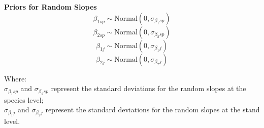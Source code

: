 \documentclass[11pt,letter]{article}
\begin{document}
\textbf{Priors for Random Slopes}
\[
\beta_{1 sp} \sim \text{Normal}(0, \sigma_{\beta_1 sp})
\]
\[
\beta_{2 sp} \sim \text{Normal}(0, \sigma_{\beta_2 sp})
\]
\[
\beta_{1 j} \sim \text{Normal}(0, \sigma_{\beta_1 j})
\]
\[
\beta_{2 j} \sim \text{Normal}(0, \sigma_{\beta_2 j})
\]

Where:\\ %
\(\sigma_{\beta_1 sp}\) and \(\sigma_{\beta_2 sp}\) represent the standard deviations for the random slopes at the species level;\\
\(\sigma_{\beta_1 j}\) and \(\sigma_{\beta_2 j}\) represent the standard deviations for the random slopes at the stand level. %
\end{document}
